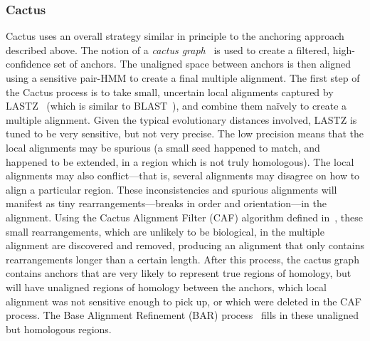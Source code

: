 \documentclass[fleqn,10pt]{wlscirep}
\begin{document}
\subsubsection{Cactus}
Cactus uses an overall strategy similar in principle to the anchoring approach described above.
The notion of a \emph{cactus graph}~\cite{cactusJCompBio} is used to create a filtered, high-confidence set of anchors.
The unaligned space between anchors is then aligned using a sensitive pair-HMM to create a final multiple alignment.
The first step of the Cactus process is to take small, uncertain local alignments captured by LASTZ~\cite{lastz} (which is similar to BLAST~\cite{blast}), and combine them naïvely to create a multiple alignment.
Given the typical evolutionary distances involved, LASTZ is tuned to be very sensitive, but not very precise.
The low precision means that the local alignments may be spurious (a small seed happened to match, and happened to be extended, in a region which is not truly homologous).
The local alignments may also conflict---that is, several alignments may disagree on how to align a particular region.
These inconsistencies and spurious alignments will manifest as tiny rearrangements---breaks in order and orientation---in the alignment.
Using the Cactus Alignment Filter (CAF) algorithm defined in~\cite{cactusGenomeRes}, these small rearrangements, which are unlikely to be biological, in the multiple alignment are discovered and removed, producing an alignment that only contains rearrangements longer than a certain length.
After this process, the cactus graph contains anchors that are very likely to represent true regions of homology, but will have unaligned regions of homology between the anchors, which local alignment was not sensitive enough to pick up, or which were deleted in the CAF process.
The Base Alignment Refinement (BAR) process~\cite{cactusGenomeRes} fills in these unaligned but homologous regions.
\end{document}
